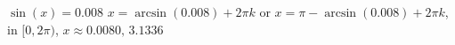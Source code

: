  {$\sin(x) = 0.008$}
{ $x = \arcsin(0.008) + 2\pi k$ or $x = \pi - \arcsin(0.008) + 2\pi k$, in  $[0, 2\pi)$, $x \approx 0.0080, \, 3.1336$}
